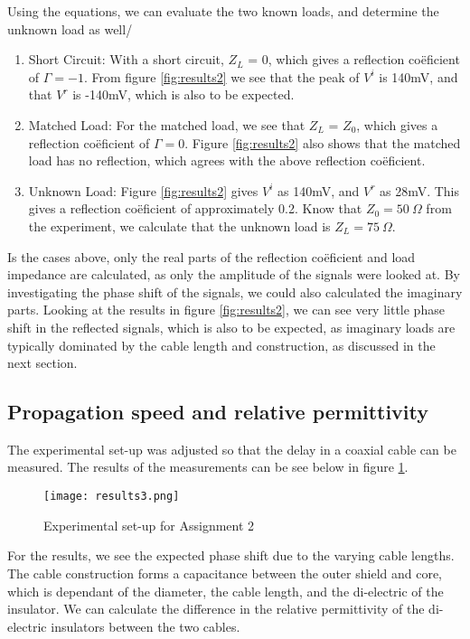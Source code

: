 Using the equations, we can evaluate the two known loads, and determine the unknown load as well/
\begin{enumerate}
	\item Short Circuit: With a short circuit, $Z_L$ = 0, which gives a reflection co\"eficient of $\Gamma = -1$.  From figure \ref{fig:results2} we see that the peak of $V^i$ is 140mV, and that $V^r$ is -140mV, which is also to be expected.

	\item Matched Load: For the matched load, we see that $Z_L$ = $Z_0$, which gives a reflection co\"eficient of $\Gamma = 0$. Figure \ref{fig:results2} also shows that the matched load has no reflection, which agrees with the above reflection co\"eficient.
	
	\item Unknown Load: Figure \ref{fig:results2} gives $V^i$ as 140mV, and $V^r$ as 28mV. This gives a reflection co\"eficient of approximately 0.2. Know that $Z_0 = 50 \ \Omega$ from the experiment, we calculate that the unknown load is $Z_L = 75 \ \Omega$.
\end{enumerate}

Is the cases above, only the real parts of the reflection co\"eficient and load impedance are calculated, as only the amplitude of the signals were looked at. By investigating the phase shift of the signals, we could also calculated the imaginary parts. Looking at the results in figure \ref{fig:results2}, we can see very little phase shift in the reflected signals, which is also to be expected, as imaginary loads are typically dominated by the cable length and construction, as discussed in the next section.

\subsection*{Propagation speed and relative permittivity}

The experimental set-up was adjusted so that the delay in a coaxial cable can be measured. The results of the measurements can be see below in figure \ref{fig:results3}.

\begin{figure}[H]
	\centering
	\texttt{[image: results3.png]}
	\caption{Experimental set-up for Assignment 2}
	\label{fig:results3}
\end{figure}

For the results, we see the expected phase shift due to the varying cable lengths. The cable construction forms a capacitance between the outer shield and core, which is dependant of the diameter, the cable length, and the di-electric of the insulator. We can calculate the difference in the relative permittivity of the di-electric insulators between the two cables.

